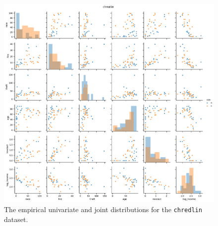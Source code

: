 \documentclass[letterpaper,11pt]{article}
\begin{document}
\begin{figure}
  \centering
  \includegraphics[width=\textwidth]{p1_pair_plots.pdf}
  \caption{The empirical univariate and joint distributions for the
    \texttt{chredlin} dataset.}
  \label{fig:p1_pair_plots}
\end{figure}
\end{document}

